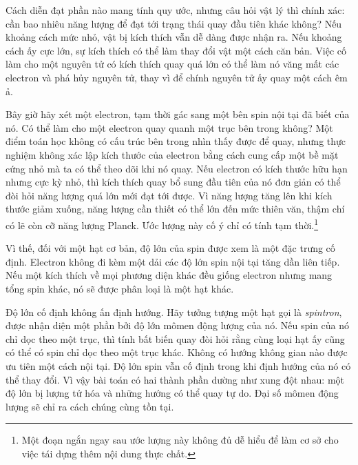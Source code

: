 Cách diễn đạt phần nào mang tính quy ước, nhưng câu hỏi vật lý thì chính xác: cần bao nhiêu năng lượng để đạt tới trạng thái quay đầu tiên khác không? Nếu khoảng cách mức nhỏ, vật bị kích thích vẫn dễ dàng được nhận ra. Nếu khoảng cách ấy cực lớn, sự kích thích có thể làm thay đổi vật một cách căn bản. Việc cố làm cho một nguyên tử có kích thích quay quá lớn có thể làm nó văng mất các electron và phá hủy nguyên tử, thay vì để chính nguyên tử ấy quay một cách êm ả.

Bây giờ hãy xét một electron, tạm thời gác sang một bên spin nội tại đã biết của nó. Có thể làm cho một electron quay quanh một trục bên trong không? Một điểm toán học không có cấu trúc bên trong nhìn thấy được để quay, nhưng thực nghiệm không xác lập kích thước của electron bằng cách cung cấp một bề mặt cứng nhỏ mà ta có thể theo dõi khi nó quay. Nếu electron có kích thước hữu hạn nhưng cực kỳ nhỏ, thì kích thích quay bổ sung đầu tiên của nó đơn giản có thể đòi hỏi năng lượng quá lớn mới đạt tới được. Vì năng lượng tăng lên khi kích thước giảm xuống, năng lượng cần thiết có thể lớn đến mức thiên văn, thậm chí có lẽ còn cỡ năng lượng Planck. Ước lượng này cố ý chỉ có tính tạm thời.\footnote{Một đoạn ngắn ngay sau ước lượng này không đủ dễ hiểu để làm cơ sở cho việc tái dựng thêm nội dung thực chất.}

Vì thế, đối với một hạt cơ bản, độ lớn của spin được xem là một đặc trưng cố định. Electron không đi kèm một dải các độ lớn spin nội tại tăng dần liên tiếp. Nếu một kích thích về mọi phương diện khác đều giống electron nhưng mang tổng spin khác, nó sẽ được phân loại là một hạt khác.

Độ lớn cố định không ấn định hướng. Hãy tưởng tượng một hạt gọi là \emph{spintron}, được nhận diện một phần bởi độ lớn mômen động lượng của nó. Nếu spin của nó chỉ dọc theo một trục, thì tính bất biến quay đòi hỏi rằng cùng loại hạt ấy cũng có thể có spin chỉ dọc theo một trục khác. Không có hướng không gian nào được ưu tiên một cách nội tại. Độ lớn spin vẫn cố định trong khi định hướng của nó có thể thay đổi. Vì vậy bài toán có hai thành phần dường như xung đột nhau: một độ lớn bị lượng tử hóa và những hướng có thể quay tự do. Đại số mômen động lượng sẽ chỉ ra cách chúng cùng tồn tại.


